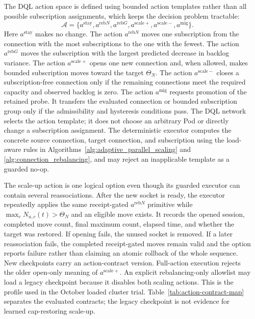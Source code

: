 \documentclass[manuscript]{acmart}
\begin{document}
The DQL action space is defined using bounded action templates rather than all
possible subscription assignments, which keeps the decision problem tractable:
\begin{equation}
	\mathcal{A}=
	\{a^{\mathrm{stay}},a^{\mathrm{reb}N},a^{\mathrm{reb}G},a^{\mathrm{scale}+},a^{\mathrm{scale}-},a^{\mathrm{mig}}\}.
	\label{eq:dql_actions}
\end{equation}
Here $a^{\mathrm{stay}}$ makes no change. The action $a^{\mathrm{reb}N}$ moves one subscription
from the connection with the most subscriptions to the one with the fewest.
The action $a^{\mathrm{reb}G}$ moves the subscription with the largest predicted decrease
in backlog variance. The action $a^{\mathrm{scale}+}$ opens one new connection and,
when allowed, makes bounded subscription moves toward the target $\Theta_N$.
The action $a^{\mathrm{scale}-}$ closes a subscription-free connection only if the
remaining connections meet the required capacity and observed backlog is zero.
The action $a^{\mathrm{mig}}$ requests promotion of the retained probe. It transfers the
evaluated connection or bounded subscription group only if the admissibility
and hysteresis conditions pass. The DQL network selects
the action template; it does not choose an arbitrary Pod or directly change a
subscription assignment. The deterministic executor computes the concrete
source connection, target connection, and subscription using the load-aware
rules in Algorithms~\ref{alg:adaptive_parallel_scaling} and
\ref{alg:connection_rebalancing}, and may reject an inapplicable template as a
guarded no-op.

The scale-up action is one logical option even though its guarded executor can
contain several reassociations. After the new socket is ready, the executor
repeatedly applies the same receipt-gated $a^{\mathrm{reb}N}$ primitive while
$\max_c N_{u,c}(t)>\Theta_N$ and an eligible move exists. It records the opened
session, completed move count, final maximum count, elapsed time, and whether
the target was restored. If opening fails, the unused socket is removed. If a
later reassociation fails, the completed receipt-gated moves remain valid and
the option reports failure rather than claiming an atomic rollback of the
whole sequence. New checkpoints carry an action-contract version.
Full-action execution rejects the older open-only meaning of
$a^{\mathrm{scale}+}$. An explicit rebalancing-only allowlist may load a legacy
checkpoint because it disables both scaling actions. This is the profile used
in the October loaded cluster trial. Table~\ref{tab:action-contract-map}
separates the evaluated contracts; the legacy checkpoint is not evidence for
learned cap-restoring scale-up.
\end{document}
